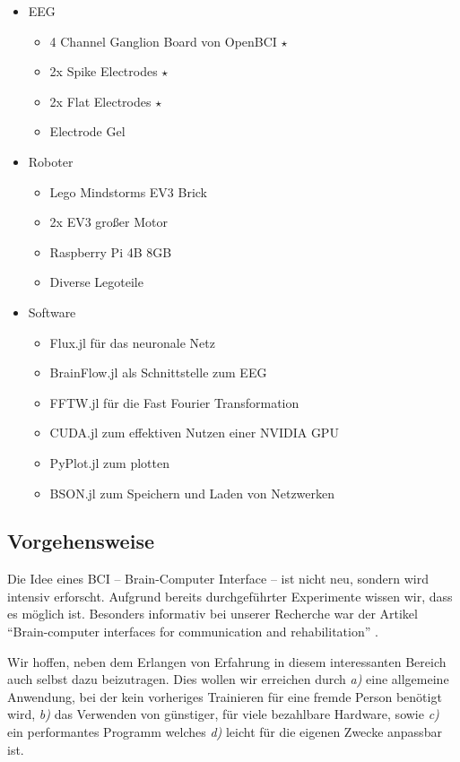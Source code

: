 \documentclass{scrartcl}
\begin{document}
	\begin{itemize}
		\item EEG
		\begin{itemize}
			\item 4 Channel Ganglion Board von OpenBCI $\star$
			\item 2x Spike Electrodes  $\star$
			\item 2x Flat Electrodes $\star$
			\item Electrode Gel 
		\end{itemize}

		\item Roboter
		\begin{itemize}
			\item Lego Mindstorms EV3 Brick
			\item 2x EV3 großer Motor
			\item Raspberry Pi 4B 8GB
			\item Diverse Legoteile
		\end{itemize}

		\item Software
		\begin{itemize}
			\item Flux.jl für das neuronale Netz
			\item BrainFlow.jl als Schnittstelle zum EEG
			\item FFTW.jl für die Fast Fourier Transformation
			\item CUDA.jl zum effektiven Nutzen einer NVIDIA GPU
			\item PyPlot.jl zum plotten
			\item BSON.jl zum Speichern und Laden von Netzwerken
		\end{itemize}
	\end{itemize}

	\subsection{Vorgehensweise}

	Die Idee eines BCI -- Brain-Computer Interface -- ist nicht neu, sondern wird intensiv erforscht. Aufgrund bereits durchgeführter Experimente wissen wir, dass es möglich ist. Besonders informativ bei unserer Recherche war der Artikel \enquote{Brain-computer interfaces for communication and rehabilitation} \cite{BCIChaudhary}.

	Wir hoffen, neben dem Erlangen von Erfahrung in diesem interessanten Bereich auch selbst dazu beizutragen. Dies wollen wir erreichen durch 
	\textit{a)} eine allgemeine Anwendung, bei der kein vorheriges Trainieren für eine fremde Person benötigt wird, \textit{b)} das Verwenden von günstiger, für viele bezahlbare Hardware, sowie \textit{c)} ein performantes Programm welches \textit{d)} leicht für die eigenen Zwecke anpassbar ist.
\end{document}
